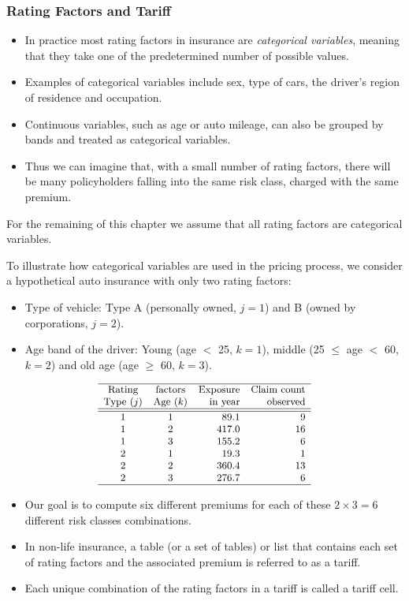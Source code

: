 \documentclass[ignorenonframetext,]{beamer}
\begin{document}
\begin{frame}[allowframebreaks]
\frametitle{Rating Factors and Tariff}
\begin{itemize}
\item In practice most rating factors in insurance are \emph{categorical variables}, meaning that they take one of the predetermined number of possible values. \item Examples of categorical variables include sex, type of cars, the driver's region of residence and occupation. 
\item Continuous variables, such as age or auto mileage, can also be grouped by bands and treated as categorical variables. 
\item Thus we can imagine that, with a small number of rating factors, there will be many policyholders falling into the same risk class,  charged with the same premium. 
\end{itemize}
For the remaining of this chapter we assume that all rating factors are categorical variables.  

\framebreak

To illustrate how categorical variables are used in the pricing process, we consider a hypothetical auto insurance with only two rating factors:  
\begin{itemize}
 \item Type of vehicle: Type A (personally owned, $j=1$) and B (owned by corporations, $j=2$).
 \item Age band of the driver:  Young (age $<$ 25, $k=1$), middle (25 $\le$ age $<$ 60, $k=2$) and old age (age $\ge$ 60, $k=3$).
\end{itemize}
$$
{\small
\begin{matrix}
\begin{array}{ccrr}
 \hline
\text{Rating} &\text{factors}  &   \text{Exposure} & \text{Claim count} \\
\text{Type }(j) & \text{Age }(k) &  \text{in year} & \text{observed}\\
\hline \hline
1 & 1 &  89.1 & 9\\
1 & 2   & 417.0& 16\\
1 & 3  & 155.2 & 6  \\
2  & 1  & 19.3 & 1 \\
2  & 2  & 360.4 & 13 \\
2   & 3  & 276.7 & 6 \\ \hline
\end{array}
\end{matrix}
}
$$

\begin{itemize}
\item Our goal is to compute six different premiums for each of these $2 \times 3=6$ different risk classes combinations.
\item In non-life insurance, a table (or a set of tables) or list that contains each set of rating factors and the associated premium is referred to as a tariff. 
\item Each unique combination of the rating factors in a tariff is called a tariff cell.
\end{itemize}

\end{frame}
\end{document}
